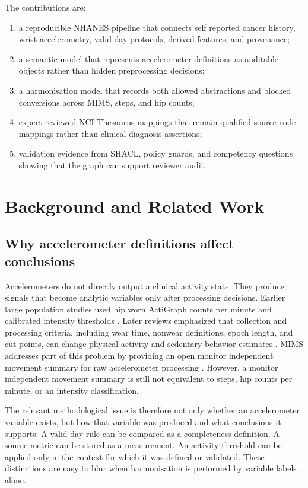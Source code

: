 \documentclass[final,5p,times,twocolumn]{elsarticle}
\begin{document}
The contributions are:
\begin{enumerate}[leftmargin=*]
    \item a reproducible NHANES pipeline that connects self reported cancer history, wrist accelerometry, valid day protocols, derived features, and provenance;
    \item a semantic model that represents accelerometer definitions as auditable objects rather than hidden preprocessing decisions;
    \item a harmonisation model that records both allowed abstractions and blocked conversions across MIMS, steps, and hip counts;
    \item expert reviewed NCI Thesaurus mappings that remain qualified source code mappings rather than clinical diagnosis assertions;
    \item validation evidence from SHACL, policy guards, and competency questions showing that the graph can support reviewer audit.
\end{enumerate}

\section{Background and Related Work}
\label{sec:background}

\subsection{Why accelerometer definitions affect conclusions}

Accelerometers do not directly output a clinical activity state. They produce signals that become analytic variables only after processing decisions. Earlier large population studies used hip worn ActiGraph counts per minute and calibrated intensity thresholds \cite{troiano2008physical,freedson1998calibration}. Later reviews emphasized that collection and processing criteria, including wear time, nonwear definitions, epoch length, and cut points, can change physical activity and sedentary behavior estimates \cite{migueles2017accelerometer}. MIMS addresses part of this problem by providing an open monitor independent movement summary for raw accelerometer processing \cite{john2019mims}. However, a monitor independent movement summary is still not equivalent to steps, hip counts per minute, or an intensity classification.

The relevant methodological issue is therefore not only whether an accelerometer variable exists, but how that variable was produced and what conclusions it supports. A valid day rule can be compared as a completeness definition. A source metric can be stored as a measurement. An activity threshold can be applied only in the context for which it was defined or validated. These distinctions are easy to blur when harmonisation is performed by variable labels alone.
\end{document}
